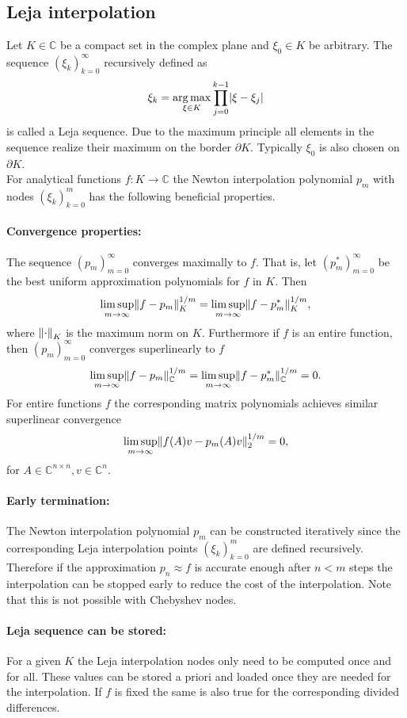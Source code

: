 \documentclass{scrartcl}
\begin{document}
	\subsection{Leja interpolation} \label{sec:LejaInterpolation}
	Let $K\in\mathbb{C}$ be a compact set in the complex plane and $\xi_0\in K$ be arbitrary. The sequence $(\xi_k)_{k=0}^{\infty}$ recursively defined as
	\[\xi_k = \underset{{\xi\in K}}{\operatorname{arg\,max}}\displaystyle\prod_{j=0}^{k-1}\lvert\xi-\xi_j\rvert\]
	is called a Leja sequence. Due to the maximum principle all elements in the sequence realize their maximum on the border $\partial K$. Typically $\xi_0$ is also chosen on $\partial K$.\\
	For analytical functions $f\!:K\to\mathbb{C}$ the Newton interpolation polynomial $p_m$ with nodes $(\xi_k)_{k=0}^{m}$ has the following beneficial properties. 
	\paragraph{Convergence properties:}
	The sequence $(p_m)_{m=0}^\infty$ converges maximally to $f$. That is, let $(p_m^{*})_{m=0}^\infty$ be the best uniform approximation polynomials for $f$ in $K$. Then
	\[\limsup\limits_{m \rightarrow \infty}\lVert f-p_m\rVert_{K}^{1/m} = \limsup\limits_{m \rightarrow \infty}\lVert f-p_m^{*}\rVert_{K}^{1/m},\]
	where ${\lVert\cdot\rVert}_K$ is the maximum norm on $K$. Furthermore if $f$ is an entire function, then $(p_m)_{m=0}^\infty$ converges superlinearly to $f$
	\[\limsup\limits_{m \rightarrow \infty}\lVert f-p_m\rVert_{\mathbb{C}}^{1/m} = \limsup\limits_{m \rightarrow \infty}\lVert f-p_m^{*}\rVert_{\mathbb{C}}^{1/m} = 0. \]
	For entire functions $f$ the corresponding matrix polynomials achieves similar superlinear convergence
	\[\limsup\limits_{m \rightarrow \infty}\lVert f(A)v-p_m(A)v\rVert_{2}^{1/m} = 0, \]
	for $A\in\mathbb{C}^{n\times n}, v\in\mathbb{C}^n$.
	
	\paragraph{Early termination:}
	The Newton interpolation polynomial $p_m$ can be constructed iteratively since the corresponding Leja interpolation points $(\xi_k)_{k=0}^{m}$ are defined recursively. Therefore if the approximation $p_n \approx f$ is accurate enough after $n<m$ steps the interpolation can be stopped early to reduce the cost of the interpolation. Note that this is not possible with Chebyshev nodes.
	
	\paragraph{Leja sequence can be stored:}
	For a given $K$ the Leja interpolation nodes only need to be computed once and for all. These values can be stored a priori and loaded once they are needed for the interpolation. If $f$ is fixed the same is also true for the corresponding divided differences. \\
	
\end{document}
